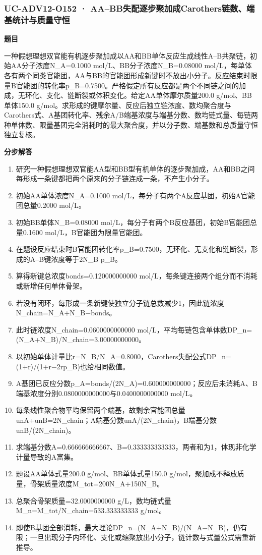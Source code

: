 \documentclass[UTF8,11pt,a4paper]{ctexart}
\begin{document}
\subsubsection*{UC-ADV12-O152 · AA–BB失配逐步聚加成Carothers链数、端基统计与质量守恒}
\noindent\textbf{题目}\par
一种假想理想双官能有机逐步聚加成以AA和BB单体反应生成线性A–B共聚链，初始AA分子浓度N\_A=0.1000 mol/L、BB分子浓度N\_B=0.08000 mol/L，每单体各有两个同类官能团，AA与BB的官能团形成新键时不放出小分子。反应结束时限量B官能团的转化率p\_B=0.7500。严格假定所有反应都是两个不同链之间的加成，无环化、支化、链断裂或体积变化。给定AA单体摩尔质量200.0 g/mol、BB单体150.0 g/mol。求形成的键摩尔量、反应后独立链浓度、数均聚合度与Carothers式、A基团转化率、残余A/B端基浓度与端基分数、数均链式量、每链两种单体数、限量基团完全消耗时的最大聚合度，并以分子数、端基数和总质量守恒独立复核。\par
\medskip\noindent\textbf{分步解答}
\begin{enumerate}
\item 研究一种假想理想双官能AA型和BB型有机单体的逐步聚加成，AA和BB之间每形成一条键都把两个原来的分子链连成一条，不产生小分子。
\item 初始AA单体浓度N\_A=0.1000 mol/L，每分子有两个A反应基团，初始A官能团总量0.2000 mol/L。
\item 初始BB单体N\_B=0.08000 mol/L，每分子有两个B反应基团，初始B官能团总量0.1600 mol/L，B官能团为限量官能团。
\item 在题设反应结束时B官能团转化率p\_B=0.7500，无环化、无支化和链断裂，形成的A–B键浓度等于2N\_B p\_B。
\item 算得新键总浓度bonds=0.120000000000 mol/L，每条键连接两个组分而不消耗或新增任何单体骨架。
\item 若没有闭环，每形成一条新键使独立分子链总数减少1，因此链浓度N\_chain=N\_A+N\_B−bonds。
\item 此时链浓度N\_chain=0.0600000000000 mol/L，平均每链包含单体数DP\_n=(N\_A+N\_B)/N\_chain=3.00000000000。
\item 以初始单体计量比r=N\_B/N\_A=0.8000，Carothers失配公式DP\_n=(1+r)/(1+r−2rp\_B)也给相同数值。
\item A基团已反应分数p\_A=bonds/(2N\_A)=0.600000000000；反应后未消耗A、B端基浓度分别0.0800000000000与0.0400000000000 mol/L。
\item 每条线性聚合物平均保留两个端基，故剩余官能团总量unA+unB=2N\_chain；A端基分数unA/(2N\_chain)，B端基分数unB/(2N\_chain)。
\item 求端基分数A=0.666666666667、B=0.333333333333，两者和为1，体现非化学计量导致的A富集。
\item 题设AA单体式量200.0 g/mol、BB单体式量150.0 g/mol，聚加成不释放质量，骨架质量浓度M\_tot=200N\_A+150N\_B。
\item 总聚合骨架质量=32.0000000000 g/L，数均链式量M\_n=M\_tot/N\_chain=533.333333333 g/mol。
\item 即使B基团全部消耗，最大理论DP\_n=(N\_A+N\_B)/(N\_A−N\_B)，仍有限；一旦出现分子内环化、支化或缩聚放出小分子，链计数与式量公式需重新推导。
\end{enumerate}
\end{document}

